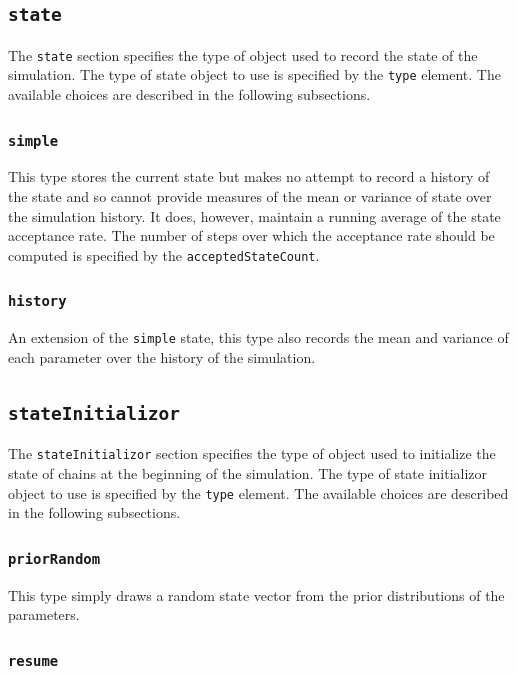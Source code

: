 \subsection{{\tt state}}

The {\tt state} section specifies the type of object used to record the state of the simulation. The type of state object to use is specified by the {\tt type} element. The available choices are described in the following subsections.

\subsubsection{{\tt simple}}

This type stores the current state but makes no attempt to record a history of the state and so cannot provide measures of the mean or variance of state over the simulation history. It does, however, maintain a running average of the state acceptance rate. The number of steps over which the acceptance rate should be computed is specified by the {\tt acceptedStateCount}.

\subsubsection{{\tt history}}

An extension of the {\tt simple} state, this type also records the mean and variance of each parameter over the history of the simulation.

\subsection{{\tt stateInitializor}}

The {\tt stateInitializor} section specifies the type of object used to initialize the state of chains at the beginning of the simulation. The type of state initializor object to use is specified by the {\tt type} element. The available choices are described in the following subsections.

\subsubsection{{\tt priorRandom}}

This type simply draws a random state vector from the prior distributions of the parameters.

\subsubsection{{\tt resume}}

